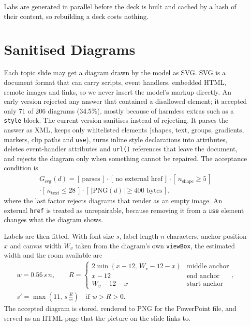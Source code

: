 \documentclass[runningheads]{llncs}
\begin{document}
Labs are generated in parallel before the deck is built and cached by a hash of their content, so rebuilding a deck costs
nothing.

\section{Sanitised Diagrams}
\label{sec:svg}
Each topic slide may get a diagram drawn by the model as SVG. SVG is a document format that can carry scripts, event handlers,
embedded HTML, remote images and links, so we never insert the model's markup directly. An early version rejected any answer that
contained a disallowed element; it accepted only 71 of 206 diagrams (34.5\%), mostly because of harmless extras such as a
\texttt{style} block. The current version sanitises instead of rejecting. It parses the answer as XML, keeps only whitelisted
elements (shapes, text, groups, gradients, markers, clip paths and \texttt{use}), turns inline style declarations into
attributes, deletes event-handler attributes and \texttt{url()} references that leave the document, and rejects the diagram only
when something cannot be repaired. The acceptance condition is
\begin{multline}
G_{\text{svg}}(d) = [\,\text{parses}\,] \cdot [\,\text{no external href}\,] \cdot [\,n_{\text{shape}} \ge 5\,] \\
\cdot [\,n_{\text{text}} \le 28\,] \cdot [\,|\mathrm{PNG}(d)| \ge 400 \text{ bytes}\,],
\end{multline}
where the last factor rejects diagrams that render as an empty image. An external \texttt{href} is treated as unrepairable,
because removing it from a \texttt{use} element changes what the diagram shows.

Labels are then fitted. With font size $s$, label length $n$ characters, anchor position $x$ and canvas width $W_v$ taken from
the diagram's own \texttt{viewBox}, the estimated width and the room available are
\begin{gather}
\label{eq:fit}
w = 0.56\, s\, n, \qquad
R = \begin{cases} 2\min(x - 12,\, W_v - 12 - x) & \text{middle anchor}\\ x - 12 & \text{end anchor}\\ W_v - 12 - x & \text{start anchor}\end{cases},\\
s' = \max\!\left(11,\, s\,\frac{R}{w}\right) \quad \text{if } w > R > 0 .
\end{gather}
The accepted diagram is stored, rendered to PNG for the PowerPoint file, and served as an HTML page that the picture on the
slide links to.
\end{document}
